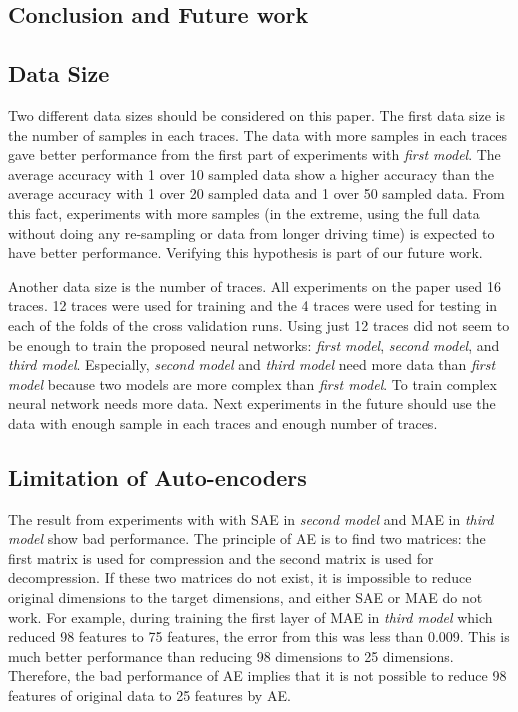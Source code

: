 \documentclass[draft,dvipsnames]{drexel-thesis}
\begin{document}
\begin{thesis}
\chapter{Conclusion and Future work}\label{chap:conclusion}
\section{Data Size}
Two different data sizes should be considered on this paper. The first data size is the number of samples in each traces. The data with more samples in each traces gave better performance from the first part of experiments with {\em first model}. The average accuracy with 1 over 10 sampled data show a higher accuracy than the average accuracy with 1 over 20 sampled data and 1 over 50 sampled data. From this fact, experiments with more samples (in the extreme, using the full data without doing any re-sampling or data from longer driving time) is expected to have better performance. Verifying this hypothesis is part of our future work.

Another data size is the number of traces. All experiments on the paper used 16 traces. 12 traces were used for training and the 4 traces were used for testing in each of the folds of the cross validation runs. Using just 12 traces did not seem to be enough to train the proposed neural networks: {\em first model}, {\em second model}, and {\em third model}. Especially, {\em second model} and {\em third model} need more data than {\em first model} because two models are more complex than {\em first model}. To train complex neural network needs more data. Next experiments in the future should use the data with enough sample in each traces and enough number of traces.

\section{Limitation of Auto-encoders}
The result from experiments with with SAE in {\em second model} and MAE in {\em third model} show bad performance. The principle of AE is to find two matrices: the first matrix is used for compression and the second matrix is used for decompression. If these two matrices do not exist, it is impossible to reduce original dimensions to the target dimensions, and either SAE or MAE do not work. For example, during training the first layer of MAE in {\em third model} which reduced 98 features to 75 features, the error from this was less than 0.009. This is much better performance than reducing 98 dimensions to 25 dimensions. Therefore, the bad performance of AE implies that it is not possible to reduce 98 features of original data to 25 features by AE.


\end{thesis}
\end{document}
